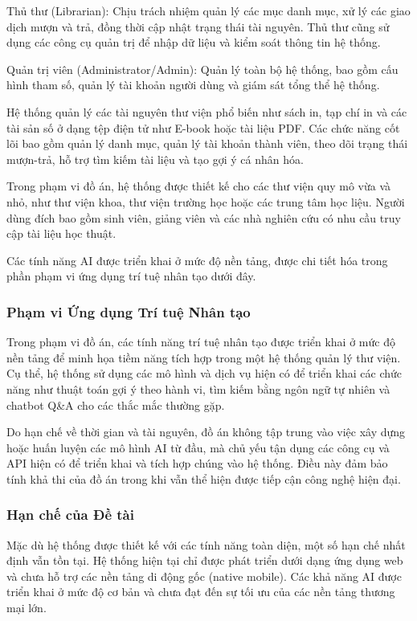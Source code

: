 Thủ thư (Librarian): Chịu trách nhiệm quản lý các mục danh mục, xử lý các giao dịch mượn và trả, đồng thời cập nhật trạng thái tài nguyên. Thủ thư cũng sử dụng các công cụ quản trị để nhập dữ liệu và kiểm soát thông tin hệ thống.

Quản trị viên (Administrator/Admin): Quản lý toàn bộ hệ thống, bao gồm cấu hình tham số, quản lý tài khoản người dùng và giám sát tổng thể hệ thống.

Hệ thống quản lý các tài nguyên thư viện phổ biến như sách in, tạp chí in và các tài sản số ở dạng tệp điện tử như E-book hoặc tài liệu PDF. Các chức năng cốt lõi bao gồm quản lý danh mục, quản lý tài khoản thành viên, theo dõi trạng thái mượn-trả, hỗ trợ tìm kiếm tài liệu và tạo gợi ý cá nhân hóa.

Trong phạm vi đồ án, hệ thống được thiết kế cho các thư viện quy mô vừa và nhỏ, như thư viện khoa, thư viện trường học hoặc các trung tâm học liệu. Người dùng đích bao gồm sinh viên, giảng viên và các nhà nghiên cứu có nhu cầu truy cập tài liệu học thuật.

Các tính năng AI được triển khai ở mức độ nền tảng, được chi tiết hóa trong phần phạm vi ứng dụng trí tuệ nhân tạo dưới đây.

\subsubsection{Phạm vi Ứng dụng Trí tuệ Nhân tạo}

Trong phạm vi đồ án, các tính năng trí tuệ nhân tạo được triển khai ở mức độ nền tảng để minh họa tiềm năng tích hợp trong một hệ thống quản lý thư viện. Cụ thể, hệ thống sử dụng các mô hình và dịch vụ hiện có để triển khai các chức năng như thuật toán gợi ý theo hành vi, tìm kiếm bằng ngôn ngữ tự nhiên và chatbot Q\&A cho các thắc mắc thường gặp.

Do hạn chế về thời gian và tài nguyên, đồ án không tập trung vào việc xây dựng hoặc huấn luyện các mô hình AI từ đầu, mà chủ yếu tận dụng các công cụ và API hiện có để triển khai và tích hợp chúng vào hệ thống. Điều này đảm bảo tính khả thi của đồ án trong khi vẫn thể hiện được tiếp cận công nghệ hiện đại.

\subsubsection{Hạn chế của Đề tài}

Mặc dù hệ thống được thiết kế với các tính năng toàn diện, một số hạn chế nhất định vẫn tồn tại. Hệ thống hiện tại chỉ được phát triển dưới dạng ứng dụng web và chưa hỗ trợ các nền tảng di động gốc (native mobile). Các khả năng AI được triển khai ở mức độ cơ bản và chưa đạt đến sự tối ưu của các nền tảng thương mại lớn.

